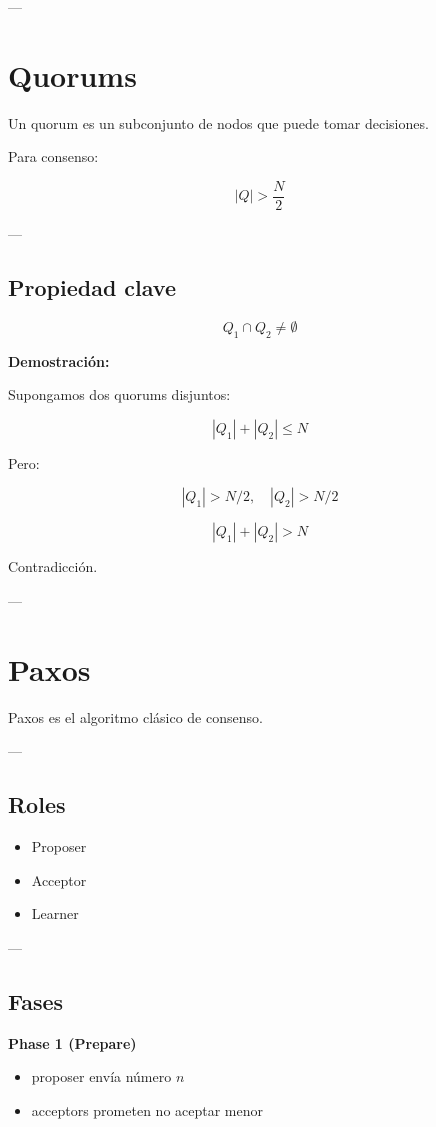 \documentclass[variant=apuntes,cover=institutional,mode=screen]{ua-engineering-v6-article}
\begin{document}
---

\section{Quorums}

Un quorum es un subconjunto de nodos que puede tomar decisiones.

Para consenso:

\[
|Q| > \frac{N}{2}
\]

---

\subsection{Propiedad clave}

\[
Q_1 \cap Q_2 \neq \emptyset
\]

\textbf{Demostración:}

Supongamos dos quorums disjuntos:

\[
|Q_1| + |Q_2| \le N
\]

Pero:

\[
|Q_1| > N/2, \quad |Q_2| > N/2
\]

\[
|Q_1| + |Q_2| > N
\]

Contradicción.

---

\section{Paxos}

Paxos es el algoritmo clásico de consenso.

---

\subsection{Roles}

\begin{itemize}
\item Proposer
\item Acceptor
\item Learner
\end{itemize}

---

\subsection{Fases}

\textbf{Phase 1 (Prepare)}
\begin{itemize}
\item proposer envía número $n$
\item acceptors prometen no aceptar menor
\end{itemize}
\end{document}
